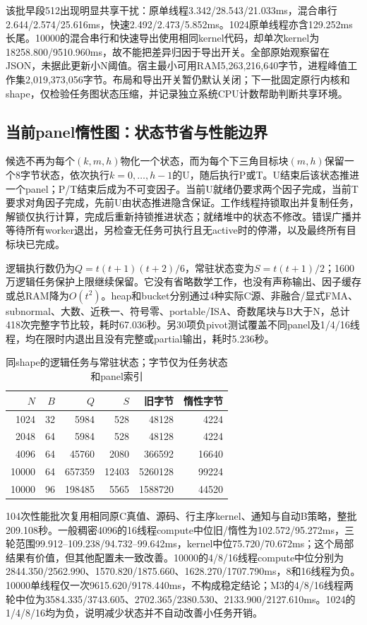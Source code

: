 \documentclass[UTF8,a4paper,11pt]{ctexart}
\begin{document}
该批早段512出现明显共享干扰：原单线程3.342/\allowbreak{}28.543/\allowbreak{}21.033ms，混合串行2.644/\allowbreak{}2.574/\allowbreak{}25.616ms，快速2.492/\allowbreak{}2.473/\allowbreak{}5.852ms。1024原单线程亦含129.252ms长尾。10000的混合串行和快速导出使用相同kernel代码，却单次kernel为18258.800/\allowbreak{}9510.960ms，故不能把差异归因于导出开关。全部原始观察留在JSON，未据此更新小N阈值。宿主最小可用RAM5,263,216,640字节，进程峰值工作集2,019,373,056字节。布局和导出开关暂仍默认关闭；下一批固定原行内核和shape，仅检验任务图状态压缩，并记录独立系统CPU计数帮助判断共享环境。

\subsection{当前panel惰性图：状态节省与性能边界}
候选不再为每个$(k,m,h)$物化一个状态，而为每个下三角目标块$(m,h)$保留一个8字节状态，依次执行$k=0,\ldots,h-1$的U，随后执行P或T。U结束后该状态推进一个panel；P/T结束后成为不可变因子。当前U就绪仍要求两个因子完成，当前T要求对角因子完成，先前U由状态推进隐含保证。工作线程持锁取出并复制任务，解锁仅执行计算，完成后重新持锁推进状态；就绪堆中的状态不修改。错误广播并等待所有worker退出，另检查无任务可执行且无active时的停滞，以及最终所有目标块已完成。

逻辑执行数仍为$Q=t(t+1)(t+2)/6$，常驻状态变为$S=t(t+1)/2$；1600万逻辑任务保护上限继续保留。它没有省略数学工作，也没有声称输出、因子缓存或总RAM降为$O(t^2)$。heap和bucket分别通过4种实际C源、非融合/显式FMA、subnormal、大数、近秩一、符号零、portable/ISA、奇数尾块与B大于N，总计418次完整字节比较，耗时67.036秒。另30项负pivot测试覆盖不同panel及1/4/16线程，均在限时内退出且没有完整或partial输出，耗时5.236秒。

\begin{table}[htbp]\centering\small
\caption{同shape的逻辑任务与常驻状态；字节仅为任务状态和panel索引}
\begin{tabular}{rrrrrr}\toprule
$N$&$B$&$Q$&$S$&旧字节&惰性字节\\\midrule
1024&32&5984&528&48128&4224\\
2048&64&5984&528&48128&4224\\
4096&64&45760&2080&366592&16640\\
10000&64&657359&12403&5260128&99224\\
10000&96&198485&5565&1588720&44520\\\bottomrule
\end{tabular}\end{table}

104次性能批次复用相同原C真值、源码、行主序kernel、通知与自动B策略，整批209.108秒。一般稠密4096的16线程compute中位旧/惰性为102.572/95.272ms，三轮范围99.912--109.238/94.732--99.642ms，kernel中位75.720/70.672ms；这个局部结果有价值，但其他配置未一致改善。10000的4/8/16线程compute中位分别为2844.350/2562.990、1570.820/1875.660、1628.270/1707.790ms，8和16线程为负。10000单线程仅一次9615.620/9178.440ms，不构成稳定结论；M3的4/8/16线程两轮中位为3584.335/3743.605、2702.365/2380.530、2133.900/2127.610ms。1024的1/4/8/16均为负，说明减少状态并不自动改善小任务开销。
\end{document}
